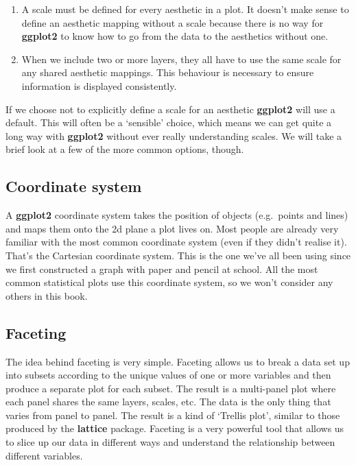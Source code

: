 \documentclass[
]{book}
\providecommand{\tightlist}{%
  \setlength{\itemsep}{0pt}\setlength{\parskip}{0pt}}
\begin{document}
\begin{enumerate}
\def\labelenumi{\arabic{enumi}.}
\tightlist
\item
  A scale must be defined for every aesthetic in a plot. It doesn't make sense to define an aesthetic mapping without a scale because there is no way for \textbf{ggplot2} to know how to go from the data to the aesthetics without one.
\item
  When we include two or more layers, they all have to use the same scale for any shared aesthetic mappings. This behaviour is necessary to ensure information is displayed consistently.
\end{enumerate}

If we choose not to explicitly define a scale for an aesthetic \textbf{ggplot2} will use a default. This will often be a `sensible' choice, which means we can get quite a long way with \textbf{ggplot2} without ever really understanding scales. We will take a brief look at a few of the more common options, though.

\hypertarget{coordinate-system}{%
\subsection{Coordinate system}\label{coordinate-system}}

A \textbf{ggplot2} coordinate system takes the position of objects (e.g.~points and lines) and maps them onto the 2d plane a plot lives on. Most people are already very familiar with the most common coordinate system (even if they didn't realise it). That's the Cartesian coordinate system. This is the one we've all been using since we first constructed a graph with paper and pencil at school. All the most common statistical plots use this coordinate system, so we won't consider any others in this book.

\hypertarget{faceting}{%
\subsection{Faceting}\label{faceting}}

The idea behind faceting is very simple. Faceting allows us to break a data set up into subsets according to the unique values of one or more variables and then produce a separate plot for each subset. The result is a multi-panel plot where each panel shares the same layers, scales, etc. The data is the only thing that varies from panel to panel. The result is a kind of `Trellis plot', similar to those produced by the \textbf{lattice} package. Faceting is a very powerful tool that allows us to slice up our data in different ways and understand the relationship between different variables.
\end{document}
